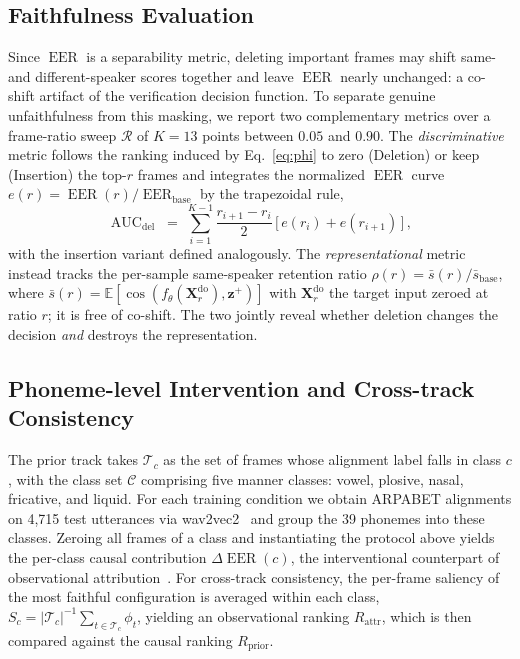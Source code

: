 \documentclass{article}
\DeclareMathOperator{\EER}{EER}
\DeclareMathOperator{\AUC}{AUC}
\DeclareMathOperator{\Do}{do}
\newcommand{\dEER}{\Delta\EER}
\begin{document}
\subsection{Faithfulness Evaluation}
\label{sec:faith}

Since $\EER$ is a separability metric, deleting important frames may shift same- and different-speaker scores together and leave $\EER$ nearly unchanged: a co-shift artifact of the verification decision function. To separate genuine unfaithfulness from this masking, we report two complementary metrics over a frame-ratio sweep $\mathcal{R}$ of $K{=}13$ points between $0.05$ and $0.90$. The \emph{discriminative} metric follows the ranking induced by Eq.~\eqref{eq:phi} to zero (Deletion) or keep (Insertion) the top-$r$ frames and integrates the normalized $\EER$ curve $e(r)=\EER(r)/\EER_{\mathrm{base}}$ by the trapezoidal rule,
\begin{equation}
  \AUC_{\mathrm{del}} \;=\; \sum_{i=1}^{K-1} \frac{r_{i+1} - r_i}{2}\,\big[\, e(r_i) + e(r_{i+1}) \,\big]\,,
  \label{eq:auc}
\end{equation}
with the insertion variant defined analogously. The \emph{representational} metric instead tracks the per-sample same-speaker retention ratio $\rho(r)=\bar{s}(r)/\bar{s}_{\mathrm{base}}$, where $\bar{s}(r)=\mathbb{E}[\cos(f_{\theta}(\mathbf{X}^{\Do}_{r}),\mathbf{z}^{+})]$ with $\mathbf{X}^{\Do}_{r}$ the target input zeroed at ratio $r$; it is free of co-shift. The two jointly reveal whether deletion changes the decision \emph{and} destroys the representation.

\subsection{Phoneme-level Intervention and Cross-track Consistency}

The prior track takes $\mathcal{T}_c$ as the set of frames whose alignment label falls in class $c$, with the class set $\mathcal{C}$ comprising five manner classes: vowel, plosive, nasal, fricative, and liquid. For each training condition we obtain ARPABET alignments on 4{,}715 test utterances via wav2vec2~\cite{xu2021wav2vec2} and group the 39 phonemes into these classes. Zeroing all frames of a class and instantiating the protocol above yields the per-class causal contribution $\dEER(c)$, the interventional counterpart of observational attribution~\cite{pearl2009causality}. For cross-track consistency, the per-frame saliency of the most faithful configuration is averaged within each class, $S_c=|\mathcal{T}_c|^{-1}\sum_{t\in\mathcal{T}_c}\phi_t$, yielding an observational ranking $R_{\mathrm{attr}}$, which is then compared against the causal ranking $R_{\mathrm{prior}}$.
\end{document}
